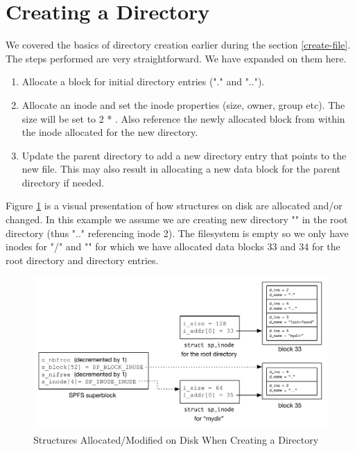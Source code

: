 
\section{Creating a Directory}\label{spfs-mkdir}

We covered the basics of directory creation earlier during the section \ref{create-file}. The steps performed are very straightforward. We have expanded on them here.

\begin{enumerate}
	\item Allocate a block for initial directory entries ("." and "..").
	\item Allocate an inode and set the inode properties (size, owner, group etc). The size will be set
		to 2 * . Also reference the newly allocated block from within the 
		inode allocated for the new directory.
	\item Update the parent directory to add a new directory entry that points to the new file. This may
		also result in allocating a new data block for the parent directory if needed.
\end{enumerate}

\noindent
Figure \ref{fig:mkdir} is a visual presentation of how structures on disk are allocated and/or changed. In this example we assume we are creating new directory "" in the root directory (thus ".." referencing inode 2). The filesystem is empty so we only have inodes for "/" and "" for which we have allocated data blocks 33 and 34 for the root directory and  directory entries.

\begin{figure}
	\includegraphics[scale=0.6]{figures/mkdir.pdf}
	\centering
	\caption{Structures Allocated/Modified on Disk When Creating a Directory}
	\label{fig:mkdir}
\end{figure}

